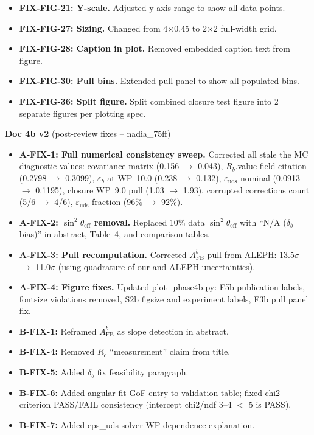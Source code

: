 \documentclass[11pt,a4paper]{article}
\begin{document}
\begin{itemize}
\item \textbf{FIX-FIG-21: Y-scale.} Adjusted y-axis range to show all data points.
\item \textbf{FIX-FIG-27: Sizing.} Changed from 4$\times$0.45 to 2$\times$2 full-width grid.
\item \textbf{FIX-FIG-28: Caption in plot.} Removed embedded caption text from figure.
\item \textbf{FIX-FIG-30: Pull bins.} Extended pull panel to show all populated bins.
\item \textbf{FIX-FIG-36: Split figure.} Split combined closure test figure into 2 separate figures per plotting spec.
\end{itemize}

\textbf{Doc 4b v2} (post-review fixes -- nadia\_75ff)
\begin{itemize}
\item \textbf{A-FIX-1: Full numerical consistency sweep.} Corrected all stale the MC diagnostic
  values: covariance matrix (0.156 $\to$ 0.043), $R_b$.value field citation (0.2798 $\to$ 0.3099),
  $\varepsilon_b$ at WP~10.0 (0.238 $\to$ 0.132), $\varepsilon_\mathrm{uds}$ nominal
  (0.0913 $\to$ 0.1195), closure WP~9.0 pull (1.03 $\to$ 1.93), corrupted corrections
  count (5/6 $\to$ 4/6), $\varepsilon_\mathrm{uds}$ fraction (96\% $\to$ 92\%).
\item \textbf{A-FIX-2: $\sin^2\theta_\mathrm{eff}$ removal.} Replaced 10\% data
  $\sin^2\theta_\mathrm{eff}$ with ``N/A ($\delta_b$ bias)'' in abstract, Table~4,
  and comparison tables.
\item \textbf{A-FIX-3: Pull recomputation.} Corrected $A_\mathrm{FB}^b$ pull from ALEPH:
  13.5$\sigma$ $\to$ 11.0$\sigma$ (using quadrature of our and ALEPH uncertainties).
\item \textbf{A-FIX-4: Figure fixes.} Updated plot\_phase4b.py: F5b publication labels,
  fontsize violations removed, S2b figsize and experiment labels, F3b pull panel fix.
\item \textbf{B-FIX-1:} Reframed $A_\mathrm{FB}^b$ as slope detection in abstract.
\item \textbf{B-FIX-4:} Removed $R_c$ ``measurement'' claim from title.
\item \textbf{B-FIX-5:} Added $\delta_b$ fix feasibility paragraph.
\item \textbf{B-FIX-6:} Added angular fit GoF entry to validation table; fixed chi2
  criterion PASS/FAIL consistency (intercept chi2/ndf 3--4 $<$ 5 is PASS).
\item \textbf{B-FIX-7:} Added eps\_uds solver WP-dependence explanation.

\end{itemize}
\end{document}
